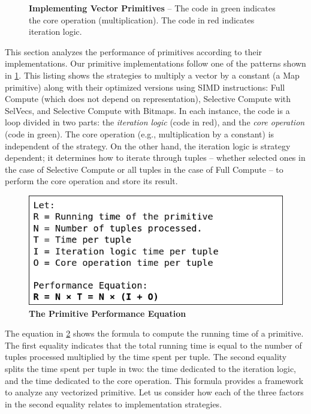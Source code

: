 \documentclass[12pt]{cmuthesis}
\begin{document}
\begin{figure}[t!]
\caption{\textbf{Implementing Vector Primitives} -- The code in green indicates the core operation (multiplication). The code in red indicates iteration logic.}
\label{fig:rationale_code}
\end{figure}

This section analyzes the performance of primitives according to their implementations. Our primitive implementations follow one of the patterns shown in \cref{fig:rationale_code}. This listing shows the strategies to multiply a vector by a constant (a Map primitive) along with their optimized versions using SIMD instructions: Full Compute (which does not depend on representation), Selective Compute with SelVecs, and Selective Compute with Bitmaps. In each instance, the code is a loop divided in two parts: the \textit{iteration logic} (code in red), and the \textit{core operation} (code in green). The core operation (e.g., multiplication by a constant) is independent of the strategy. On the other hand, the iteration logic is strategy dependent; it determines how to iterate through tuples -- whether selected ones in the case of Selective Compute or all tuples in the case of Full Compute -- to perform the core operation and store its result.

\begin{figure}[t!]
    \centering
    \includegraphics[scale=0.5]{images/PerfEq.png}
    \caption{\textbf{The Primitive Performance Equation}}
    \label{fig:perf_equation}
\end{figure}


The equation in \cref{fig:perf_equation} shows the formula to compute the running time of a primitive. The first equality indicates that the total running time is equal to the number of tuples processed multiplied by the time spent per tuple. The second equality splits the time spent per tuple in two: the time dedicated to the iteration logic, and the time dedicated to the core operation. This formula provides a framework to analyze any vectorized primitive. Let us consider how each of the three factors in the second equality relates to implementation strategies.
\end{document}
